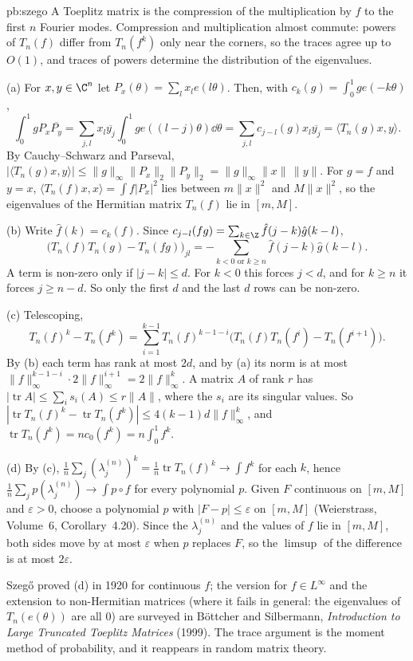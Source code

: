 \begin{solution}{pb:szego}
\idea A Toeplitz matrix is the compression of the multiplication by $f$ to the first $n$ Fourier modes. Compression and multiplication almost commute: powers of $T_n(f)$ differ from $T_n(f^k)$
only near the corners, so the traces agree up to $O(1)$, and traces of powers determine the distribution of the eigenvalues.

\writeup (a) For $x,y\in\C^n$ let $P_x(\theta)=\sum_lx_le(l\theta)$. Then, with $c_k(g)=\int_0^1ge(-k\theta)$,
\[
\int_0^1gP_x\overline{P_y}=\sum_{j,l}x_l\overline{y_j}\int_0^1ge((l-j)\theta)\dd\theta=\sum_{j,l}c_{j-l}(g)x_l\overline{y_j}=\langle T_n(g)x,y\rangle.
\]
By Cauchy--Schwarz and Parseval, $|\langle T_n(g)x,y\rangle|\le\|g\|_\infty\|P_x\|_2\|P_y\|_2=\|g\|_\infty\|x\|\,\|y\|$. For $g=f$ and $y=x$, $\langle T_n(f)x,x\rangle=\int f|P_x|^2$ lies between $m\|x\|^2$ and
$M\|x\|^2$, so the eigenvalues of the Hermitian matrix $T_n(f)$ lie in $[m,M]$.

(b) Write $\hat f(k)=c_k(f)$. Since $c_{j-l}(fg)=\sum_{k\in\Z}\hat f(j-k)\hat g(k-l)$,
\[
\bigl(T_n(f)T_n(g)-T_n(fg)\bigr)_{jl}=-\sum_{k<0\text{ or }k\ge n}\hat f(j-k)\hat g(k-l).
\]
A term is non-zero only if $|j-k|\le d$. For $k<0$ this forces $j<d$, and for $k\ge n$ it forces $j\ge n-d$. So only the first $d$ and the last $d$ rows can be non-zero.

(c) Telescoping,
\[
T_n(f)^k-T_n(f^k)=\sum_{i=1}^{k-1}T_n(f)^{k-1-i}\bigl(T_n(f)T_n(f^i)-T_n(f^{i+1})\bigr).
\]
By (b) each term has rank at most $2d$, and by (a) its norm is at most $\|f\|_\infty^{k-1-i}\cdot2\|f\|_\infty^{i+1}=2\|f\|_\infty^k$. A matrix $A$ of rank $r$ has $|\operatorname{tr}A|\le\sum_is_i(A)\le r\|A\|$,
where the $s_i$ are its singular values. So $|\operatorname{tr}T_n(f)^k-\operatorname{tr}T_n(f^k)|\le4(k-1)d\|f\|_\infty^k$, and $\operatorname{tr}T_n(f^k)=nc_0(f^k)=n\int_0^1f^k$.

(d) By (c), $\frac1n\sum_j(\lambda_j^{(n)})^k=\frac1n\operatorname{tr}T_n(f)^k\to\int f^k$ for each $k$, hence $\frac1n\sum_jp(\lambda_j^{(n)})\to\int p\circ f$ for every polynomial $p$. Given $F$ continuous on
$[m,M]$ and $\varepsilon>0$, choose a polynomial $p$ with $|F-p|\le\varepsilon$ on $[m,M]$ (Weierstrass, Volume~6, Corollary~4.20). Since the $\lambda_j^{(n)}$ and the values of $f$ lie in $[m,M]$, both
sides move by at most $\varepsilon$ when $p$ replaces $F$, so the $\limsup$ of the difference is at most $2\varepsilon$.

\leads Szegő proved (d) in 1920 for continuous $f$; the version for $f\in L^\infty$ and the extension to non-Hermitian matrices (where it fails in general: the eigenvalues of $T_n(e(\theta))$ are all $0$)
are surveyed in Böttcher and Silbermann, \emph{Introduction to Large Truncated Toeplitz Matrices} (1999). The trace argument is the moment method of probability, and it reappears in random matrix
theory.
\end{solution}

